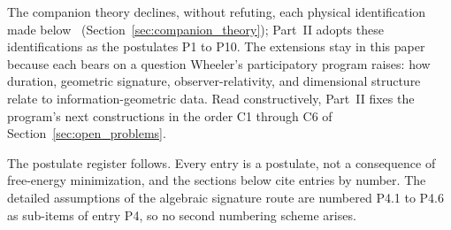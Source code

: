 \documentclass[11pt]{article}
\begin{document}
The companion theory declines, without refuting, each physical identification made below~\cite[Chs.~1 and~14]{DennisGaugeVFE2026} (Section~\ref{sec:companion_theory}); Part~II adopts these identifications as the postulates P1 to P10. The extensions stay in this paper because each bears on a question Wheeler's participatory program raises: how duration, geometric signature, observer-relativity, and dimensional structure relate to information-geometric data. Read constructively, Part~II fixes the program's next constructions in the order C1 through C6 of Section~\ref{sec:open_problems}.

The postulate register follows. Every entry is a postulate, not a consequence of free-energy minimization, and the sections below cite entries by number. The detailed assumptions of the algebraic signature route are numbered P4.1 to P4.6 as sub-items of entry P4, so no second numbering scheme arises.
\end{document}
